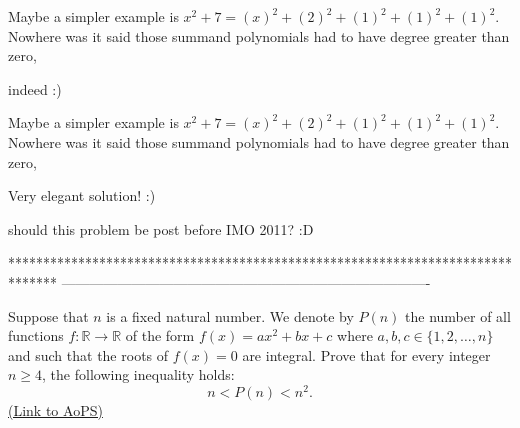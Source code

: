 \begin{solution}
	\begin{tcolorbox} Maybe a simpler example is $x^2 + 7 = (x)^2 + (2)^2 + (1)^2 + (1)^2 + (1)^2$. Nowhere was it said those summand polynomials had to have degree greater than zero,\end{tcolorbox}
indeed :)
\end{solution}



\begin{solution}
	\begin{tcolorbox}
Maybe a simpler example is $x^2 + 7 = (x)^2 + (2)^2 + (1)^2 + (1)^2 + (1)^2$. Nowhere was it said those summand polynomials had to have degree greater than zero,\end{tcolorbox}

Very elegant solution! :)
\end{solution}



\begin{solution}
	should this problem be post before IMO 2011? :D
\end{solution}
*******************************************************************************
-------------------------------------------------------------------------------

\begin{problem}
	Suppose that $n$ is a fixed natural number. We denote by $P(n)$ the number of all functions $ f: \mathbb R\to \mathbb R $ of the form $f(x)=ax^2+bx+c$ where $a,b,c \in \{1,2,\ldots,n\}$ and such that the roots of $f(x)=0$ are integral. Prove that for every integer $n\geq 4$, the following inequality holds: \[n<P(n)<n^2.\]
	\flushright \href{https://artofproblemsolving.com/community/c6h372007}{(Link to AoPS)}
\end{problem}



